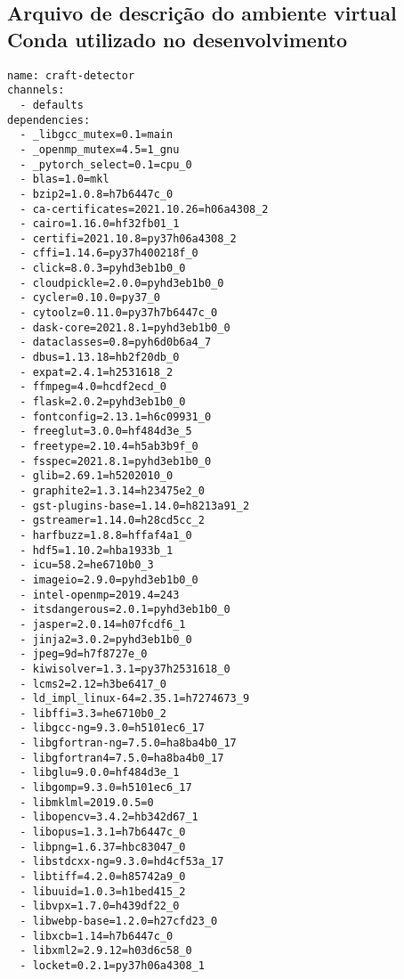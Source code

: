 
\begin{apendicesenv}

\partapendices

\chapter{Arquivo de descrição do ambiente virtual Conda utilizado no desenvolvimento}\label{apd:yaml-desenvolvimento}
\begin{verbatim}
name: craft-detector
channels:
  - defaults
dependencies:
  - _libgcc_mutex=0.1=main
  - _openmp_mutex=4.5=1_gnu
  - _pytorch_select=0.1=cpu_0
  - blas=1.0=mkl
  - bzip2=1.0.8=h7b6447c_0
  - ca-certificates=2021.10.26=h06a4308_2
  - cairo=1.16.0=hf32fb01_1
  - certifi=2021.10.8=py37h06a4308_2
  - cffi=1.14.6=py37h400218f_0
  - click=8.0.3=pyhd3eb1b0_0
  - cloudpickle=2.0.0=pyhd3eb1b0_0
  - cycler=0.10.0=py37_0
  - cytoolz=0.11.0=py37h7b6447c_0
  - dask-core=2021.8.1=pyhd3eb1b0_0
  - dataclasses=0.8=pyh6d0b6a4_7
  - dbus=1.13.18=hb2f20db_0
  - expat=2.4.1=h2531618_2
  - ffmpeg=4.0=hcdf2ecd_0
  - flask=2.0.2=pyhd3eb1b0_0
  - fontconfig=2.13.1=h6c09931_0
  - freeglut=3.0.0=hf484d3e_5
  - freetype=2.10.4=h5ab3b9f_0
  - fsspec=2021.8.1=pyhd3eb1b0_0
  - glib=2.69.1=h5202010_0
  - graphite2=1.3.14=h23475e2_0
  - gst-plugins-base=1.14.0=h8213a91_2
  - gstreamer=1.14.0=h28cd5cc_2
  - harfbuzz=1.8.8=hffaf4a1_0
  - hdf5=1.10.2=hba1933b_1
  - icu=58.2=he6710b0_3
  - imageio=2.9.0=pyhd3eb1b0_0
  - intel-openmp=2019.4=243
  - itsdangerous=2.0.1=pyhd3eb1b0_0
  - jasper=2.0.14=h07fcdf6_1
  - jinja2=3.0.2=pyhd3eb1b0_0
  - jpeg=9d=h7f8727e_0
  - kiwisolver=1.3.1=py37h2531618_0
  - lcms2=2.12=h3be6417_0
  - ld_impl_linux-64=2.35.1=h7274673_9
  - libffi=3.3=he6710b0_2
  - libgcc-ng=9.3.0=h5101ec6_17
  - libgfortran-ng=7.5.0=ha8ba4b0_17
  - libgfortran4=7.5.0=ha8ba4b0_17
  - libglu=9.0.0=hf484d3e_1
  - libgomp=9.3.0=h5101ec6_17
  - libmklml=2019.0.5=0
  - libopencv=3.4.2=hb342d67_1
  - libopus=1.3.1=h7b6447c_0
  - libpng=1.6.37=hbc83047_0
  - libstdcxx-ng=9.3.0=hd4cf53a_17
  - libtiff=4.2.0=h85742a9_0
  - libuuid=1.0.3=h1bed415_2
  - libvpx=1.7.0=h439df22_0
  - libwebp-base=1.2.0=h27cfd23_0
  - libxcb=1.14=h7b6447c_0
  - libxml2=2.9.12=h03d6c58_0
  - locket=0.2.1=py37h06a4308_1

\end{verbatim}
\end{apendicesenv}
